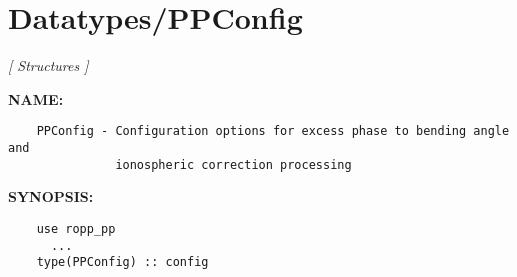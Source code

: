 \section{Datatypes/PPConfig}
\textsl{[ Structures ]}

\label{ch:robo10}
\label{ch:Datatypes_PPConfig}
\textbf{NAME:}\hspace{0.08in}\begin{Verbatim}
    PPConfig - Configuration options for excess phase to bending angle and 
               ionospheric correction processing
\end{Verbatim}
\textbf{SYNOPSIS:}\hspace{0.08in}\begin{Verbatim}
    use ropp_pp
      ...
    type(PPConfig) :: config
\end{Verbatim}

